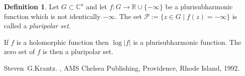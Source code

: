 \documentclass[12pt]{article}
\theoremstyle{theorem}
\theoremstyle{definition}
\newtheorem*{defn}{Definition}
\begin{document}
\begin{defn}
Let $G \subset {\mathbb{C}}^n$ and let
$f \colon G \to {\mathbb{R}} \cup \{ - \infty \}$ be a plurisubharmonic
function which is not identically $-\infty$.
The set ${\mathcal{P}} := \{ z \in G \mid f(z) = - \infty \}$ is
called a {\em pluripolar set}.
\end{defn}

If $f$ is a holomorphic function then $\log \lvert f \rvert$ is a plurisubharmonic function.  The zero set of $f$ is then
a pluripolar set.

\begin{thebibliography}{9}
Steven~G.\@ Krantz.
{\em {}},
AMS Chelsea Publishing, Providence, Rhode Island, 1992.
\end{thebibliography}
\end{document}
